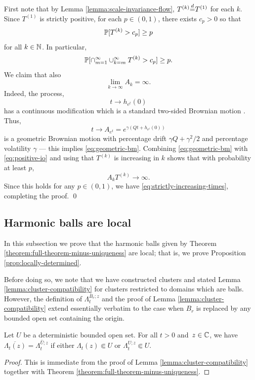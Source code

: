 \documentclass[12pt]{amsart}
\numberwithin{equation}{section}
\newcommand{\cluster}[2]{\hyperref[eq:non-co-set]{\mathit{\Lambda}^{#1}_{#2}}}
\newcommand{\regcluster}[2]{\hyperref[eq:regular-cluster]{\Lambda^{#1}_{#2}}}
\begin{document}
	
	First note that by Lemma \ref{lemma:scale-invariance-flow}, $T^{(k)} {\buildrel d \over =} T^{(1)}$ for each $k$.
	Since $T^{(1)}$ is strictly positive, for each $p \in (0,1)$, there exists 
	$c_p > 0$ so that 
	\[
	\P[T^{(k)} > c_p] \geq p
	\]
	for all $k \in \N$. In particular, 
	\begin{equation} \label{eq:positive-io}
	\P[\cap_{m=1}^{\infty} \cup_{k=m}^{\infty} T^{(k)} > c_p] \geq p.
	\end{equation}
	We claim that also
	\begin{equation} \label{eq:geometric-bm}
	\lim_{k \to \infty} A_k = \infty. 
	\end{equation}
	Indeed, the process, 
	\[
	t \to h_{e^{t}}(0)
	\]
	has a continuous modification which is a standard two-sided Brownian motion \cite[Section 3.1]{duplantier2011liouville}. 
	Thus, 
	\[
	t \to A_{e^{t}} = e^{\gamma (Q t + h_{e^{t}}(0))} 
	\]
	is a geometric Brownian motion with percentage drift $\gamma Q + \gamma^2/2$
	and percentage volatility $\gamma$ --- this implies \eqref{eq:geometric-bm}. Combining \eqref{eq:geometric-bm} with \eqref{eq:positive-io} and using that $T^{(k)}$ is increasing in $k$ shows that with probability at least $p$, 
	\[
	A_k T^{(k)} \to \infty.
	\]
	Since this holds for any $p \in (0,1)$, we have \eqref{eq:strictly-increasing-times}, 
	completing the proof. \qed
	
	
	\subsection{Harmonic balls are local}
	In this subsection we prove that the harmonic balls given by Theorem \ref{theorem:full-theorem-minus-uniqueness} are local; that is, 
	we prove Proposition \ref{prop:locally-determined}. 
	
	Before doing so, we note that we have constructed clusters and stated Lemma \ref{lemma:cluster-compatibility} for clusters restricted to domains which are balls.
	However, the definition of $\cluster{B_r; z}{t}$ and the proof of Lemma \ref{lemma:cluster-compatibility} extend essentially verbatim to the case when $B_r$ is replaced by any bounded open set containing the origin.
	
	\begin{lemma} \label{lemma:strong-compatibility}
		Let $U$ be a deterministic bounded open set. 
		For all $t > 0$ and~$z \in \C$, we have $\overline{{\regcluster{}{t}(z)}} = \overline{\cluster{U; z}{t}}$ if either ${\regcluster{}{t}(z)} \Subset U$ or $\cluster{U; z}{t} \Subset U$.
	\end{lemma}
	\begin{proof}
		This is immediate from the proof of Lemma \ref{lemma:cluster-compatibility} together with Theorem \ref{theorem:full-theorem-minus-uniqueness}. 
	\end{proof}
	
\end{document}
